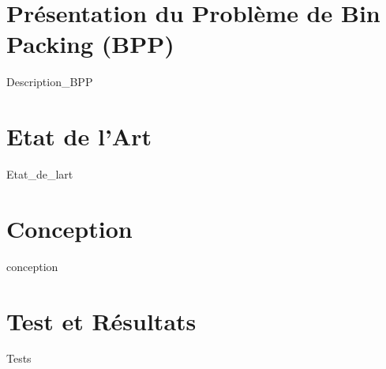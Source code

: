 \documentclass[12pt,a4paper, titlepage]{report}
\begin{document}
    \chapter{Présentation du Problème de Bin Packing (BPP)}
    {Description_BPP}
    \chapter{Etat de l'Art}
    {Etat_de_lart}
    \chapter{Conception}
    {conception}
    \chapter{Test et Résultats}
    {Tests}
\end{document}
